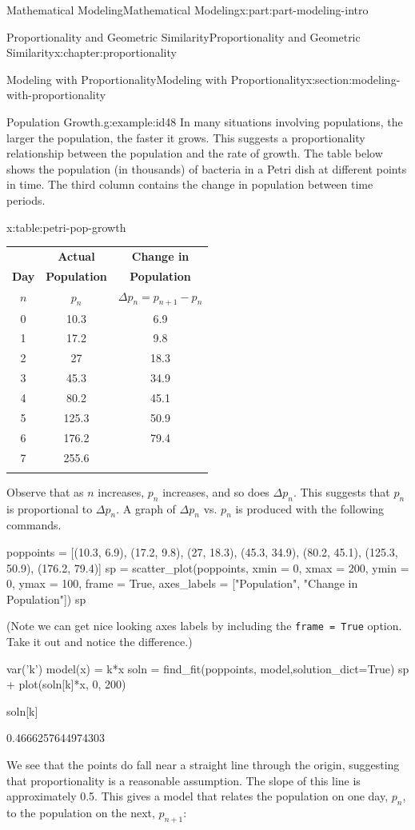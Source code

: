 \documentclass[oneside,10pt,]{book}
\newcommand{\tabularfont}{\relax}
\newcommand{\mono}[1]{\texttt{#1}}
\numberwithin{equation}{section}
\newcommand{\hrulethin}  {\noalign{\hrule height 0.04em}}
\newcommand{\hrulethick} {\noalign{\hrule height 0.11em}}
\begin{document}
\begin{partptx}{Mathematical Modeling}{}{Mathematical Modeling}{}{}{x:part:part-modeling-intro}
\begin{chapterptx}{Proportionality and Geometric Similarity}{}{Proportionality and Geometric Similarity}{}{}{x:chapter:proportionality}
\begin{sectionptx}{Modeling with Proportionality}{}{Modeling with Proportionality}{}{}{x:section:modeling-with-proportionality}
\begin{example}{Population Growth.}{g:example:id48}%
In many situations involving populations, the larger the population, the faster it grows. This suggests a proportionality relationship between the population and the rate of growth. The table below shows the population (in thousands) of bacteria in a Petri dish at different points in time. The third column contains the change in population between time periods.%
\par
\begin{tableptx}{\textbf{}}{x:table:petri-pop-growth}{}%
\centering%
{\tabularfont%
\begin{tabular}{ccc}\hrulethick
\textbf{}&\textbf{Actual}&\textbf{Change in}\tabularnewline[0pt]
\textbf{Day}&\textbf{Population}&\textbf{Population}\tabularnewline[0pt]
\textbf{\(n\)}&\textbf{\(p_n\)}&\textbf{\(\Delta p_n = p_{n+1}-p_n\)}\tabularnewline\hrulethin
0&10.3&6.9\tabularnewline[0pt]
1&17.2&9.8\tabularnewline[0pt]
2&27&18.3\tabularnewline[0pt]
3&45.3&34.9\tabularnewline[0pt]
4&80.2&45.1\tabularnewline[0pt]
5&125.3&50.9\tabularnewline[0pt]
6&176.2&79.4\tabularnewline[0pt]
7&255.6&\tabularnewline\hrulethick
\end{tabular}
}%
\end{tableptx}%
%
\par
Observe that as \(n\) increases, \(p_n\) increases, and so does \(\Delta p_n\). This suggests that \(p_n\) is proportional to \(\Delta p_n\). A graph of \(\Delta p_n\) vs. \(p_n\) is produced with the following commands.%
\begin{sageinput}
poppoints = [(10.3, 6.9), (17.2, 9.8), (27, 18.3), (45.3, 34.9), (80.2, 45.1), (125.3, 50.9), (176.2, 79.4)]
sp = scatter_plot(poppoints, xmin = 0, xmax = 200, ymin = 0, ymax = 100, frame = True, axes_labels = ["Population", "Change in Population"])
sp
\end{sageinput}
(Note we can get nice looking axes labels by including the \mono{frame = True} option. Take it out and notice the difference.)%
\begin{sageinput}
var('k')
model(x) = k*x
soln = find_fit(poppoints, model,solution_dict=True)
sp + plot(soln[k]*x, 0, 200)
\end{sageinput}
\begin{sageinput}
soln[k]
\end{sageinput}
\begin{sageoutput}
0.4666257644974303
\end{sageoutput}
We see that the points do fall near a straight line through the origin, suggesting that proportionality is a reasonable assumption. The slope of this line is approximately 0.5. This gives a model that relates the population on one day, \(p_n\), to the population on the next, \(p_{n+1}\):%

\end{example}
\end{sectionptx}
\end{chapterptx}
\end{partptx}
\end{document}
